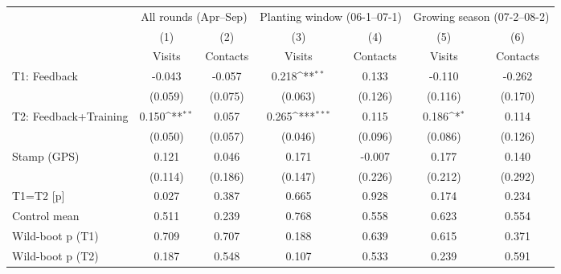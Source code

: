 {
\def\sym#1{\ifmmode^{#1}\else\(^{#1}\)\fi}
\begin{tabular}{l*{6}{c}}
\toprule
                    &\multicolumn{2}{c}{All rounds (Apr--Sep)}  &\multicolumn{2}{c}{Planting window (06-1--07-1)}&\multicolumn{2}{c}{Growing season (07-2--08-2)}\\\cmidrule(lr){2-3}\cmidrule(lr){4-5}\cmidrule(lr){6-7}
                    &\multicolumn{1}{c}{(1)}&\multicolumn{1}{c}{(2)}&\multicolumn{1}{c}{(3)}&\multicolumn{1}{c}{(4)}&\multicolumn{1}{c}{(5)}&\multicolumn{1}{c}{(6)}\\
                    &\multicolumn{1}{c}{Visits}&\multicolumn{1}{c}{Contacts}&\multicolumn{1}{c}{Visits}&\multicolumn{1}{c}{Contacts}&\multicolumn{1}{c}{Visits}&\multicolumn{1}{c}{Contacts}\\
\midrule
T1: Feedback        &      -0.043         &      -0.057         &       0.218\sym{**} &       0.133         &      -0.110         &      -0.262         \\
                    &     (0.059)         &     (0.075)         &     (0.063)         &     (0.126)         &     (0.116)         &     (0.170)         \\
T2: Feedback+Training&       0.150\sym{**} &       0.057         &       0.265\sym{***}&       0.115         &       0.186\sym{*}  &       0.114         \\
                    &     (0.050)         &     (0.057)         &     (0.046)         &     (0.096)         &     (0.086)         &     (0.126)         \\
Stamp (GPS)         &       0.121         &       0.046         &       0.171         &      -0.007         &       0.177         &       0.140         \\
                    &     (0.114)         &     (0.186)         &     (0.147)         &     (0.226)         &     (0.212)         &     (0.292)         \\
\midrule
T1=T2 [p]           &       0.027         &       0.387         &       0.665         &       0.928         &       0.174         &       0.234         \\
Control mean        &       0.511         &       0.239         &       0.768         &       0.558         &       0.623         &       0.554         \\
Wild-boot p (T1)    &       0.709         &       0.707         &       0.188         &       0.639         &       0.615         &       0.371         \\
Wild-boot p (T2)    &       0.187         &       0.548         &       0.107         &       0.533         &       0.239         &       0.591         \\

\end{tabular}}
